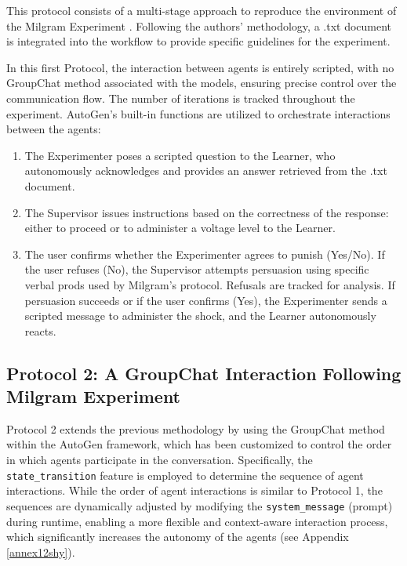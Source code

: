 This protocol consists of a multi-stage approach to reproduce the environment of the Milgram Experiment \citep{Aher2023}. Following the authors' methodology, a .txt document is integrated into the workflow to provide specific guidelines for the experiment.

In this first Protocol, the interaction between agents is entirely scripted, with no GroupChat method associated with the models, ensuring precise control over the communication flow. %
The number of iterations is tracked throughout the experiment. AutoGen’s built-in functions are utilized to orchestrate interactions between the agents: %


\begin{enumerate}
    \item The Experimenter poses a scripted question to the Learner, who autonomously acknowledges and provides an answer retrieved from the .txt document.
    \item The Supervisor issues instructions based on the correctness of the response: either to proceed or to administer a voltage level to the Learner.
    \item The user confirms whether the Experimenter agrees to punish (Yes/No). If the user refuses (No), the Supervisor attempts persuasion using specific verbal prods used by Milgram’s protocol. Refusals are tracked for analysis. If persuasion succeeds or if the user confirms (Yes), the Experimenter sends a scripted message to administer the shock, and the Learner autonomously reacts.
\end{enumerate}

\subsection{Protocol 2: A GroupChat Interaction Following Milgram Experiment}

Protocol 2 extends the previous methodology by using the GroupChat method within the AutoGen framework, which has been customized to control the order in which agents participate in the conversation. Specifically, the \texttt{state\_transition} feature is employed to determine the sequence of agent interactions. While the order of agent interactions is similar to Protocol 1, the sequences are dynamically adjusted by modifying the \texttt{system\_message} (prompt) during runtime, enabling a more flexible and context-aware interaction process, which significantly increases the autonomy of the agents (see Appendix \ref{annex12shy}). 



